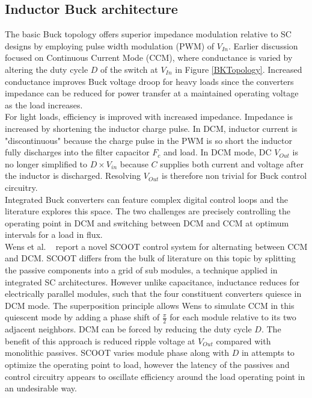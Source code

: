 \documentclass[letterpaper,twocolumn,10pt]{article}
\begin{document}
\subsection{Inductor Buck architecture} \label{BuckArchitectureResearch}
The basic Buck topology offers superior impedance modulation relative to SC designs by employing pulse width modulation (PWM) of $V_{In}$. Earlier discussion focused on Continuous Current Mode (CCM), where conductance is varied by altering the duty cycle $D$ of the switch at $V_{In}$ in Figure \ref{BKTopology}. Increased conductance improves Buck voltage droop for heavy loads since the converters impedance can be reduced for power transfer at a maintained operating voltage as the load increases.\\
For light loads, efficiency is improved with increased impedance. Impedance is increased by shortening the inductor charge pulse. In DCM, inductor current is "discontinuous" because the charge pulse in the PWM is so short the inductor fully discharges into the filter capacitor $F_c$ and load. In DCM mode, DC $V_{Out}$ is no longer simplified to $D \times V_{in}$ because $C$ supplies both current and voltage after the inductor is discharged. Resolving $V_{Out}$ is therefore non trivial for Buck control circuitry.\\
\indent Integrated Buck converters can feature complex digital control loops and the literature explores this space. The two challenges are precisely controlling the operating point in DCM and switching between DCM and CCM at optimum intervals for a load in flux.\\
Wens et al. ~\cite{Wens2011} report a novel SCOOT control system for alternating between CCM and DCM. SCOOT differs from the bulk of literature on this topic by splitting the passive components into a grid of sub modules, a technique applied in integrated SC architectures. However unlike capacitance, inductance reduces for electrically parallel modules, such that the four constituent converters quiesce in DCM mode. The superposition principle allows Wens to simulate CCM in this quiescent mode by adding a phase shift of $\frac{\pi}{2}$ for each module relative to its two adjacent neighbors. DCM can be forced by reducing the duty cycle $D$. The benefit of this approach is reduced ripple voltage at $V_{Out}$ compared with monolithic passives. SCOOT varies module phase along with $D$ in attempts to optimize the operating point to load, however the latency of the passives and control circuitry appears to oscillate efficiency around the load operating point in an undesirable way.\\
\end{document}
